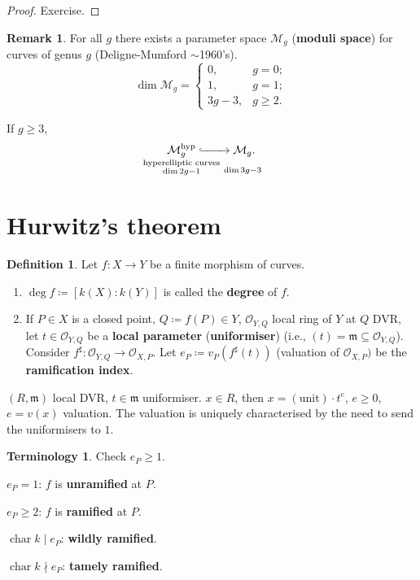 \documentclass[12pt]{article}
\DeclareMathOperator{\chara}{char}
\theoremstyle{definition}
\newtheorem*{definition}{Definition}
\newtheorem*{remark}{Remark}
\newtheorem*{terminology}{Terminology}
\theoremstyle{remark}
\begin{document}
\begin{proof}
Exercise.
\end{proof}

\begin{remark}
For all $g$ there exists a parameter space $\mathcal{M}_g$ (\textbf{moduli space}) for curves of genus $g$ (Deligne-Mumford $\sim$1960's).
\[\dim\mathcal{M}_g=\left\{\begin{array}{ll}0,&g=0;\\1,&g=1;\\3g-3,&g\geq2.\end{array}\right.\]

If $g\geq3$,
\[{\vphantom{\mathcal{M}_g^{\text{hyp}}}}\underset{\mathclap{\substack{\text{hyperelliptic curves}\\\dim2g-1}}}{\mathcal{M}_g^{\text{hyp}}}\lhook\joinrel\xrightarrow{\hspace{7mm}}\underset{\mathclap{\substack{\vphantom{hyplt}\\\dim3g-3}}}{\mathcal{M}_g}.\]
\end{remark}

\section{Hurwitz's theorem}
\begin{definition}
Let $f:X\rightarrow Y$ be a finite morphism of curves.

\begin{enumerate}[label=\arabic*)]
\item $\deg f\coloneqq[k(X):k(Y)]$ is called the \textbf{degree} of $f$.

\item If $P\in X$ is a closed point, $Q\coloneqq f(P)\in Y$, $\mathcal{O}_{Y,Q}$ local ring of $Y$ at $Q$ DVR, let $t\in\mathcal{O}_{Y,Q}$ be a \textbf{local parameter} (\textbf{uniformiser}) (i.e., $(t)=\mathfrak{m}\subseteq\mathcal{O}_{Y,Q}$). Consider $f^{\sharp}:\mathcal{O}_{Y,Q}\rightarrow\mathcal{O}_{X,P}$. Let $e_P\coloneqq v_P(f^{\sharp}(t))$ (valuation of $\mathcal{O}_{X,P})$ be the \textbf{ramification index}.
\end{enumerate}
\end{definition}

$(R,\mathfrak{m})$ local DVR, $t\in \mathfrak{m}$ uniformiser. $x\in R$, then $x=(\text{unit})\cdot t^e$, $e\geq0$, $e=v(x)$ valuation. The valuation is uniquely characterised by the need to send the uniformisers to $1$.

\begin{terminology}
Check $e_P\geq1$.

$e_P=1$: $f$ is \textbf{unramified} at $P$.

$e_P\geq2$: $f$ is \textbf{ramified} at $P$.

$\chara k\mid e_P$: \textbf{wildly ramified}.

$\chara k\nmid e_P$: \textbf{tamely ramified}.
\end{terminology}
\end{document}
